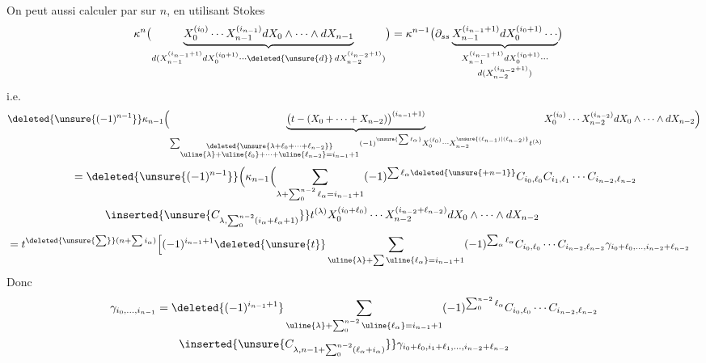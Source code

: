 On peut aussi calculer par  sur $n$, en utilisant Stokes
\[
\begin{aligned}
\kappa^n\bigl(\underbrace{X_0^{(i_0)}\cdots X_{n-1}^{(i_{n-1})}dX_0\wedge\cdots\wedge dX_{n-1}}_{d(X_{n-1}^{(i_{n-1}+1)}dX_0^{(i_0+1)}\cdots\deleted{\unsure{d}}\,dX_{n-2}^{(i_{n-2}+1)})}\bigr)
 &=\kappa^{n-1}\bigl(\partial_{ss}\underbrace{X_{n-1}^{(i_{n-1}+1)}dX_0^{(i_0+1)}\cdots}_{\substack{X_{n-1}^{(i_{n-1}+1)}dX_0^{(i_0+1)}\cdots\\d(X_{n-2}^{(i_{n-2}+1)})}}\bigr)
\end{aligned}
\]
i.e.\quad\deleted{$\unsure{\gamma}$}
\[
\deleted{\unsure{(-1)^{n-1}}}\kappa_{n-1}\Bigl(
\underbrace{\bigl(t-(X_0+\cdots+X_{n-2})\bigr)^{(i_{n-1}+1)}}_{
 \sum_{\substack{\deleted{\unsure{\lambda+\ell_0+\cdots+\ell_{n-2}}}\\\uline{\lambda}+\uline{\ell_0}+\cdots+\uline{\ell_{n-2}}=i_{n-1}+1}}
 (-1)^{\unsure{\sum\ell_\alpha}}X_0^{(\ell_0)}\cdots X_{n-2}^{\unsure{(\ell_{n-1})|(\ell_{n-2})}}t^{(\lambda)}}
 X_0^{(i_0)}\cdots X_{n-2}^{(i_{n-2})}dX_0\wedge\cdots\wedge dX_{n-2}\Bigr)
\]
\[
\begin{aligned}
&=\deleted{\unsure{(-1)^{n-1}}}\Bigl(\kappa_{n-1}\Bigl(
\sum_{\lambda+\sum_0^{n-2}\ell_\alpha=i_{n-1}+1}
 (-1)^{\sum\ell_\alpha\deleted{\unsure{+n-1}}}
 C_{i_0,\ell_0}C_{i_1,\ell_1}\cdots C_{i_{n-2},\ell_{n-2}}\\
&\hspace{3em}\inserted{\unsure{C_{\lambda,\sum_0^{n-2}(i_\alpha+\ell_\alpha+1)}}}
 t^{(\lambda)}X_0^{(i_0+\ell_0)}\cdots X_{n-2}^{(i_{n-2}+\ell_{n-2})}dX_0\wedge\cdots\wedge dX_{n-2}
\end{aligned}
\]
\[
\begin{aligned}
&=t^{\deleted{\unsure{\sum}}(n+\sum i_\alpha)}\Bigl[
 (-1)^{i_{n-1}+1}\deleted{\unsure{t}}
 \sum_{\uline{\lambda}+\sum\uline{\ell_\alpha}=i_{n-1}+1}
 (-1)^{\sum_\alpha\ell_\alpha}
 C_{i_0,\ell_0}\cdots C_{i_{n-2},\ell_{n-2}}
 \gamma_{i_0+\ell_0,\ldots,i_{n-2}+\ell_{n-2}}
\end{aligned}
\]
Donc
\[
\begin{aligned}
\gamma_{i_0,\ldots,i_{n-1}}
 &=\deleted{(-1)^{i_{n-1}+1}}
 \sum_{\uline{\lambda}+\sum_0^{n-2}\uline{\ell_\alpha}=i_{n-1}+1}
 (-1)^{\sum_0^{n-2}\ell_\alpha}
 C_{i_0,\ell_0}\cdots C_{i_{n-2},\ell_{n-2}}\\
&\qquad\inserted{\unsure{C_{\lambda,n-1+\sum_0^{n-2}(\ell_\alpha+i_\alpha)}}}
 \gamma_{i_0+\ell_0,i_1+\ell_1,\ldots,i_{n-2}+\ell_{n-2}}
\end{aligned}
\]
